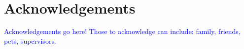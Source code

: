 \section*{Acknowledgements}

\newlength\oldparskip
\setlength{\oldparskip}{\parskip}
\setlength{\parskip}{1cm}

{\noindent
\textcolor{blue}{Acknowledgements go here! Those to acknowledge can include: family, friends, pets, supervisors.}
}

%


\setlength{\parskip}{\oldparskip}
